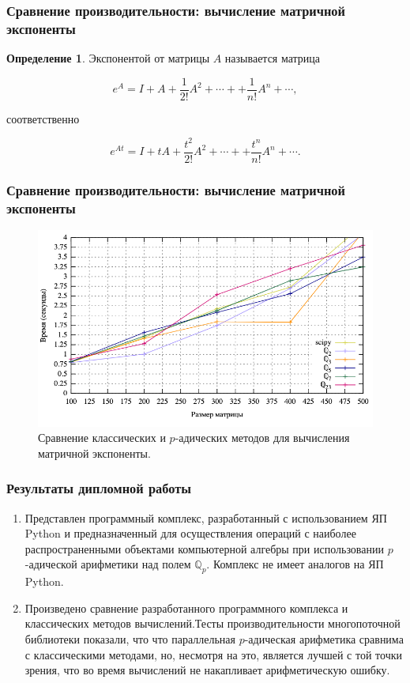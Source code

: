 \documentclass[10pt,professionalfont,utf8,presentation,compress]{beamer}
\theoremstyle{definition}
\newtheorem{defn}{Определение}
\theoremstyle{plain}
\begin{document}
\begin{frame}
\frametitle{Сравнение производительности: вычисление матричной экспоненты}
\begin{defn}\label{def:exp}
Экспонентой от матрицы $A$ называется матрица

\begin{equation}
e^A=I+A+\frac{1}{2!}A^2+\cdots++\frac{1}{n!}A^n + \cdots,
\end{equation}

\noindent соответственно

\begin{equation}
e^{At}=I+tA+\frac{t^2}{2!}A^2+\cdots++\frac{t^n}{n!}A^n + \cdots.
\end{equation}
\end{defn}
\end{frame}


\begin{frame}
\frametitle{Сравнение производительности: вычисление матричной экспоненты}
\begin{figure}[H]
\centerline{\includegraphics[width=0.95\linewidth]{../gnuplot/exp/plot.png}}
\caption{Сравнение классических и $p$-адических методов для вычисления матричной экспоненты.}
\label{img:exp:plot}
\end{figure}
\end{frame}


\begin{frame}
    \frametitle{Результаты дипломной работы}
    \begin{enumerate}
        \item Представлен программный комплекс, разработанный с использованием ЯП Python и предназначенный для осуществления операций с наиболее распространенными объектами компьютерной алгебры при использовании $p$-адической арифметики над полем $\mathbb{Q}_p$. Комплекс не имеет аналогов на ЯП Python.
        \item Произведено сравнение разработанного программного комплекса и классических методов вычислений.Тесты производительности многопоточной библиотеки показали, что что параллельная $p$-адическая арифметика сравнима с классическими методами, но, несмотря на это, является лучшей с той точки зрения, что во время вычислений не накапливает арифметическую ошибку.
    \end{enumerate}    
\end{frame}
\end{document}
